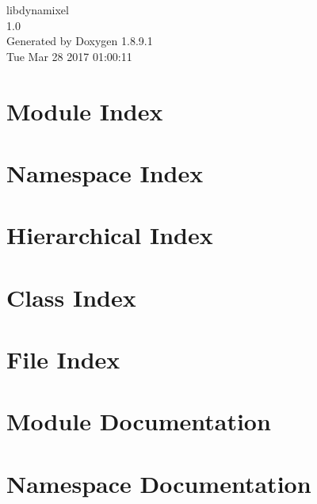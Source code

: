 \documentclass[twoside]{book}
\newcommand{\+}{\discretionary{\mbox{\scriptsize$\hookleftarrow$}}{}{}}
\newcommand{\clearemptydoublepage}{%
  \newpage{\pagestyle{empty}\cleardoublepage}%
}
\begin{document}
\hypersetup{pageanchor=false,
             bookmarks=true,
             bookmarksnumbered=true,
             pdfencoding=unicode
            }
\begin{titlepage}
\vspace*{7cm}
\begin{center}%
{\Large libdynamixel \\[1ex]\large 1.\+0 }\\
\vspace*{1cm}
{\large Generated by Doxygen 1.8.9.1}\\
\vspace*{0.5cm}
{\small Tue Mar 28 2017 01:00:11}\\
\end{center}
\end{titlepage}
\clearemptydoublepage
\tableofcontents
\clearemptydoublepage
{}
\hypersetup{pageanchor=true}

\chapter{Module Index}

\chapter{Namespace Index}

\chapter{Hierarchical Index}

\chapter{Class Index}

\chapter{File Index}

\chapter{Module Documentation}


\chapter{Namespace Documentation}







\end{document}

